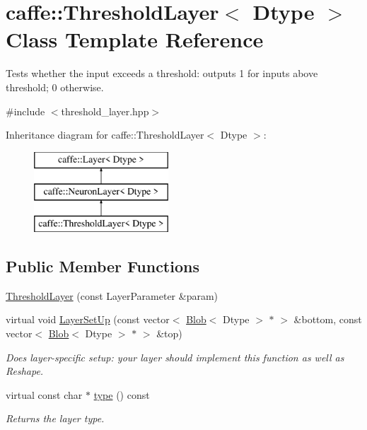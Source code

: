 \hypertarget{classcaffe_1_1ThresholdLayer}{}\section{caffe\+:\+:Threshold\+Layer$<$ Dtype $>$ Class Template Reference}
\label{classcaffe_1_1ThresholdLayer}


Tests whether the input exceeds a threshold\+: outputs 1 for inputs above threshold; 0 otherwise.  




{\ttfamily \#include $<$threshold\+\_\+layer.\+hpp$>$}

Inheritance diagram for caffe\+:\+:Threshold\+Layer$<$ Dtype $>$\+:\begin{figure}[H]
\begin{center}
\leavevmode
\includegraphics[height=3.000000cm]{classcaffe_1_1ThresholdLayer}
\end{center}
\end{figure}
\subsection*{Public Member Functions}
\begin{DoxyCompactItemize}
\item 
\hyperlink{classcaffe_1_1ThresholdLayer_a18883bf3cb9c29828acd59b8216ba1de}{Threshold\+Layer} (const Layer\+Parameter \&param)
\item 
virtual void \hyperlink{classcaffe_1_1ThresholdLayer_a9568049d6c53efcd64829742e4847bc9}{Layer\+Set\+Up} (const vector$<$ \hyperlink{classcaffe_1_1Blob}{Blob}$<$ Dtype $>$ $\ast$ $>$ \&bottom, const vector$<$ \hyperlink{classcaffe_1_1Blob}{Blob}$<$ Dtype $>$ $\ast$ $>$ \&top)
\begin{DoxyCompactList}\small\item\em Does layer-\/specific setup\+: your layer should implement this function as well as Reshape. \end{DoxyCompactList}\item 
virtual const char $\ast$ \hyperlink{classcaffe_1_1ThresholdLayer_a76736a76d69ef537f252d36adeadf476}{type} () const \hypertarget{classcaffe_1_1ThresholdLayer_a76736a76d69ef537f252d36adeadf476}{}\label{classcaffe_1_1ThresholdLayer_a76736a76d69ef537f252d36adeadf476}

\begin{DoxyCompactList}\small\item\em Returns the layer type. \end{DoxyCompactList}\end{DoxyCompactItemize}

